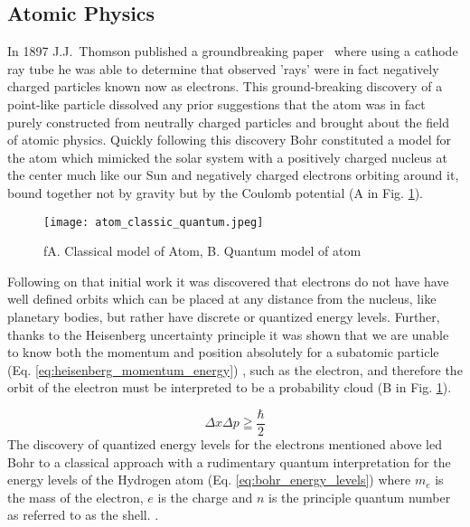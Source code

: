 \documentclass[jon_ringuette_thesis.tex]{subfiles}
\begin{document}
    \subsection{Atomic Physics}
    In 1897 J.J.\ Thomson published a groundbreaking paper~\cite{Thomson1897} where using a cathode ray tube he was able to determine that observed 'rays' were in fact negatively charged particles known now as electrons.
    This ground-breaking discovery of a point-like particle dissolved any prior suggestions that the atom was in fact purely constructed from neutrally charged particles and brought about the field of atomic physics.
    Quickly following this discovery Bohr constituted a model for the atom which mimicked the solar system with a positively charged nucleus at the center much like our Sun and negatively charged electrons orbiting around it, bound together not by gravity but by the Coulomb potential (A in Fig. \ref{fig:atom_classic_quantum}).

    \begin{figure}[H]
        \begin{center}
            \texttt{[image: atom\_classic\_quantum.jpeg]}
        \end{center}
        \caption{fA. Classical model of Atom, B. Quantum model of atom \cite{LeBellac2006}}
        \label{fig:atom_classic_quantum}
    \end{figure}

    Following on that initial work it was discovered that electrons do not have have well defined orbits which can be placed at any distance from the nucleus, like planetary bodies, but rather have discrete or quantized energy levels.
    Further, thanks to the Heisenberg uncertainty principle it was shown that we are unable to know both the momentum and position absolutely for a subatomic particle (Eq. \ref{eq:heisenberg_momentum_energy}) , such as the electron, and therefore the orbit of the electron must be interpreted to be a probability cloud (B in Fig. \ref{fig:atom_classic_quantum}).

    \begin{equation}
        \Delta x \Delta p \geqq \frac{\hbar}{2}
        \label{eq:heisenberg_momentum_energy}
    \end{equation}
    The discovery of quantized energy levels for the electrons mentioned above led Bohr to a classical approach with a rudimentary quantum interpretation for the energy levels of the Hydrogen atom (Eq. \ref{eq:bohr_energy_levels}) where $m_e$ is the mass of the electron, $e$ is the charge and $n$ is the principle quantum number as referred to as the shell. \cite{LeBellac2006}.
\end{document}

